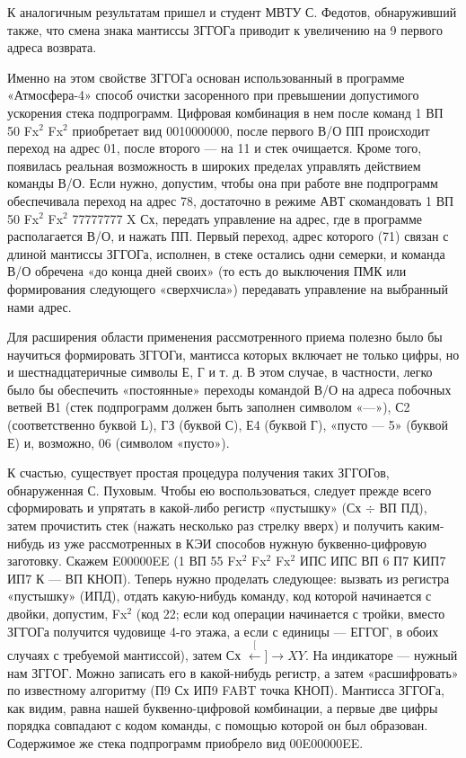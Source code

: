 \documentclass[11pt,a4paper,oneside]{article}
\def\XY{$\stackrel[\leftarrow]{\rightarrow}{XY}$}
\begin{document}
К аналогичным результатам пришел и студент МВТУ С. Федотов, обнаруживший также, что смена знака мантиссы ЗГГОГа приводит к увеличению на 9 первого адреса возврата.

Именно на этом свойстве ЗГГОГа основан использованный в программе «Атмосфера-4» способ очистки засоренного при превышении допустимого ускорения стека подпрограмм. Цифровая комбинация в нем после команд 1 ВП 50 Fx$^{2}$ Fx$^{2}$ приобретает вид 0010000000, после первого В/О ПП происходит переход на адрес 01, после второго — на 11 и стек очищается. Кроме того, появилась реальная возможность в широких пределах управлять действием команды В/О. Если нужно, допустим, чтобы она при работе вне подпрограмм обеспечивала переход на адрес 78, достаточно в режиме АВТ скомандовать 1 ВП 50 Fx$^{2}$ Fx$^{2}$ 77777777 X Сх, передать управление на адрес, где в программе располагается В/О, и нажать ПП. Первый переход, адрес которого (71) связан с длиной мантиссы ЗГГОГа, исполнен, в стеке остались одни семерки, и команда В/О обречена «до конца дней своих» (то есть до выключения ПМК или формирования следующего «сверхчисла») передавать управление на выбранный нами адрес.

Для расширения области применения рассмотренного приема полезно было бы научиться формировать ЗГГОГи, мантисса которых включает не только цифры, но и шестнадцатеричные символы Е, Г и т. д. В этом случае, в частности, легко было бы обеспечить «постоянные» переходы командой В/О на адреса побочных ветвей В1 (стек подпрограмм должен быть заполнен символом «—»), С2 (соответственно буквой L), ГЗ (буквой С), Е4 (буквой Г), «пусто — 5» (буквой Е) и, возможно, 06 (символом «пусто»).

К счастью, существует простая процедура получения таких ЗГГОГов, обнаруженная С. Пуховым. Чтобы ею воспользоваться, следует прежде всего сформировать и упрятать в какой-либо регистр «пустышку» (Сх $\div$ ВП ПД), затем прочистить стек (нажать несколько раз стрелку вверх) и получить каким-нибудь из уже рассмотренных в КЭИ способов нужную буквенно-цифровую заготовку. Скажем E00000EE (1 ВП 55 Fx$^{2}$ Fx$^{2}$ Fx$^{2}$ ИПС ИПС ВП 6 П7 КИП7 ИП7 К — ВП КНОП). Теперь нужно проделать следующее: вызвать из регистра «пустышку» (ИПД), отдать какую-нибудь команду, код которой начинается с двойки, допустим, Fx$^{2}$ (код 22; если код операции начинается с тройки, вместо ЗГГОГа получится чудовище 4-го этажа, а если с единицы — ЕГГОГ, в обоих случаях с требуемой мантиссой), затем Сх \XY. На индикаторе — нужный нам ЗГГОГ. Можно записать его в какой-нибудь регистр, а затем «расшифровать» по известному алгоритму (П9 Сх ИП9 FABT точка КНОП). Мантисса ЗГГОГа, как видим, равна нашей буквенно-цифровой комбинации, а первые две цифры порядка совпадают с кодом команды, с помощью которой он был образован. Содержимое же стека подпрограмм приобрело вид 00E00000EE.
\end{document}
